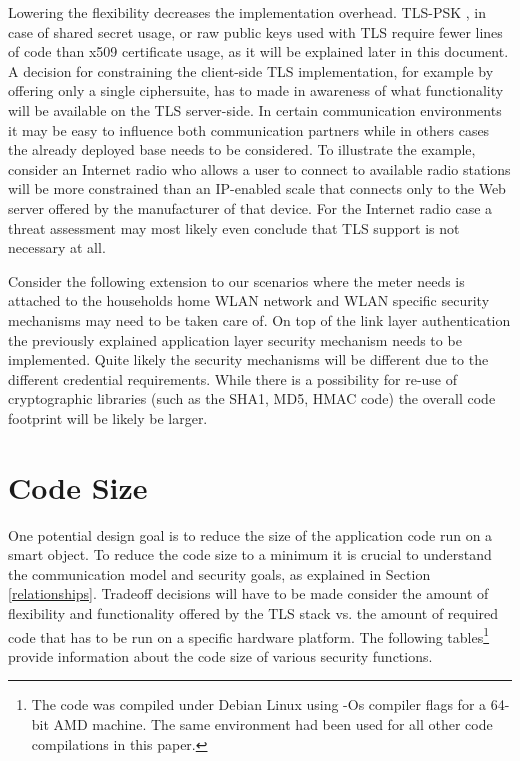 \documentclass[a4paper, 10pt]{IEEEtran}
\begin{document}
Lowering the flexibility decreases the implementation overhead. TLS-PSK \cite{rfc4279}, in case of shared secret usage, or raw public keys used with TLS \cite{I-d.ietf-tls-oob-pubkey} require fewer lines of code than x509 certificate usage, as it will be explained later in this document. A decision for constraining the client-side TLS implementation, for example by offering only a single ciphersuite, has to made in awareness of what functionality will be available on the TLS server-side. In certain communication environments it may be easy to influence both communication partners while in others cases the already deployed base needs to be considered. To illustrate the example, consider an Internet radio who allows a user to connect to available radio stations will be more constrained than an IP-enabled scale that connects only to the Web server offered by the manufacturer of that device. For the Internet radio case a threat assessment may most likely even conclude that TLS support is not necessary at all. 

Consider the following extension to our scenarios where the meter needs is attached to the households home WLAN network and WLAN specific security mechanisms may need to be taken care of. On top of the link layer authentication the previously explained application layer security mechanism needs to be implemented. Quite likely the security mechanisms will be different due to the different credential requirements. While there is a possibility for re-use of cryptographic libraries (such as the SHA1, MD5, HMAC code) the overall code footprint will be likely be larger. 

\section{Code Size}

One potential design goal is to reduce the size of the application code run on a smart object. To reduce the code size to a minimum it is crucial to understand the communication model and security goals, as explained in Section \ref{relationships}. Tradeoff decisions will have to be made consider the amount of flexibility and functionality offered by the TLS stack vs. the amount of required code that has to be run on a specific hardware platform. The following tables\footnote{The code was compiled under Debian Linux using -Os compiler flags for a 64-bit AMD machine. The same environment had been used for all other code compilations in this paper.} provide information about the code size of various security functions. 
\end{document}
